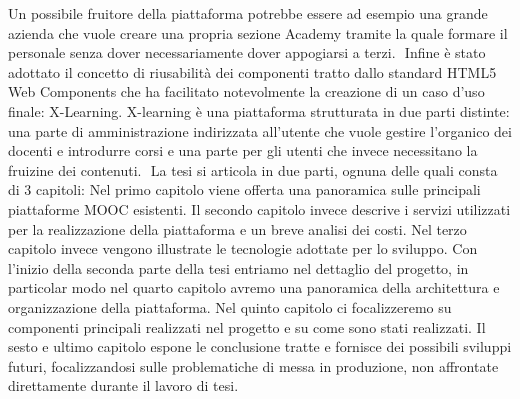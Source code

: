 Un possibile fruitore della piattaforma potrebbe essere ad esempio una grande azienda che vuole creare una propria sezione Academy tramite la quale formare il personale senza dover necessariamente dover appogiarsi a terzi. 
​
Infine è stato adottato il concetto di riusabilità dei componenti tratto dallo standard HTML5 Web Components che ha facilitato notevolmente la creazione di un caso d'uso finale: X-Learning.
X-learning è una piattaforma strutturata in due parti distinte: una parte di amministrazione indirizzata all'utente che vuole gestire l'organico dei docenti e introdurre corsi e una parte per gli utenti che invece necessitano la fruizine dei contenuti.
​
​La tesi si articola in due parti, ognuna delle quali consta di 3 capitoli:
Nel primo capitolo viene offerta una panoramica sulle principali piattaforme MOOC esistenti.
Il secondo capitolo invece descrive i servizi utilizzati per la realizzazione della piattaforma e un breve analisi dei costi.
Nel terzo capitolo invece vengono illustrate le tecnologie adottate per lo sviluppo.
Con l'inizio della seconda parte della tesi entriamo nel dettaglio del progetto, in particolar modo nel quarto capitolo avremo una panoramica della architettura e organizzazione della piattaforma.
Nel quinto capitolo ci focalizzeremo su componenti principali realizzati nel progetto e su come sono stati realizzati.
Il sesto e ultimo capitolo espone le conclusione tratte e fornisce dei possibili sviluppi futuri, focalizzandosi sulle problematiche di messa in produzione, non affrontate direttamente durante il lavoro di tesi.
